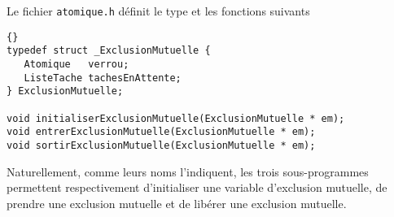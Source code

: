    Le fichier {\tt atomique.h} définit le type et les fonctions
suivants 

\begin{lstlisting}{}
typedef struct _ExclusionMutuelle {
   Atomique   verrou;
   ListeTache tachesEnAttente;
} ExclusionMutuelle;

void initialiserExclusionMutuelle(ExclusionMutuelle * em);
void entrerExclusionMutuelle(ExclusionMutuelle * em);
void sortirExclusionMutuelle(ExclusionMutuelle * em);
\end{lstlisting}

   Naturellement, comme leurs noms l'indiquent, les trois
sous-programmes permettent respectivement d'initialiser une variable
d'exclusion mutuelle, de prendre une exclusion mutuelle et de libérer
une exclusion mutuelle.

